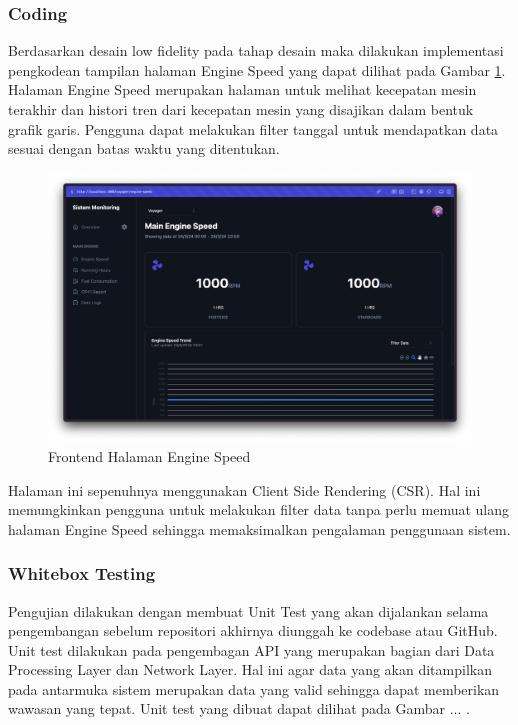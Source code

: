 \subsubsection{Coding}

Berdasarkan desain low fidelity pada tahap desain maka dilakukan implementasi pengkodean tampilan halaman Engine Speed yang dapat dilihat pada Gambar \ref{fig:fe-es}. Halaman Engine Speed merupakan halaman untuk melihat kecepatan mesin terakhir dan histori tren dari kecepatan mesin yang disajikan dalam bentuk grafik garis. Pengguna dapat melakukan filter tanggal untuk mendapatkan data sesuai dengan batas waktu yang ditentukan.

\begin{figure}[!h]
    \includegraphics[width=1.05\linewidth, center]{images/hasil/iterations/1/fe-es.png}
    \caption{Frontend Halaman Engine Speed}
    \label{fig:fe-es}
\end{figure}

Halaman ini sepenuhnya menggunakan Client Side Rendering (CSR). Hal ini memungkinkan pengguna untuk melakukan filter data tanpa perlu memuat ulang halaman Engine Speed sehingga memaksimalkan pengalaman penggunaan sistem.

\newpage

\subsubsection{Whitebox Testing}
Pengujian dilakukan dengan membuat Unit Test yang akan dijalankan selama pengembangan sebelum repositori akhirnya diunggah ke codebase atau GitHub. Unit test dilakukan pada pengembagan API yang merupakan bagian dari Data Processing Layer dan Network Layer. Hal ini agar data yang akan ditampilkan pada antarmuka sistem merupakan data yang valid sehingga dapat memberikan wawasan yang tepat. Unit test yang dibuat dapat dilihat pada Gambar ... .


